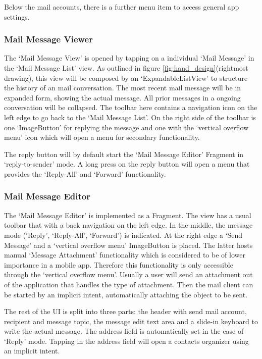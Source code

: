 \documentclass[a4paper,11pt,twoside]{article}
\begin{document}
Below the mail accounts, there is a further menu item to access general app
settings.

\subsubsection{Mail Message Viewer}
The `Mail Message View' is opened by tapping on a individual `Mail Message' in
the `Mail Message List' view. As outlined in figure
\ref{fig:hand_design}(rightmost drawing), this view will be composed by an
`ExpandableListView' to structure the history of an mail conversation. The most
recent mail message will be in expanded form, showing the actual message. All
prior messages in a ongoing conversation will be collapsed. The toolbar here
contains a navigation icon on the left edge to go back to the `Mail Message
List'. On the right side of the toolbar is one `ImageButton' for replying the
message and one with the `vertical overflow menu' icon which will open a menu
for secondary functionality.

The reply button will by default start the `Mail Message Editor' Fragment in
`reply-to-sender' mode. A long press on the reply button will open a menu that
provides the `Reply-All' and `Forward' functionality.


\subsubsection{Mail Message Editor}
The `Mail Message Editor' is implemented as a Fragment. The view has a usual
toolbar that with a back navigation on the left edge. In the middle, the message
mode (`Reply', `Reply-All', `Forward') is indicated. At the right edge a `Send
Message' and a `vertical overflow menu' ImageButton is placed. The latter hosts
manual `Message Attachment' functionality which is considered to be of lower importance
in a mobile app. Therefore this functionality is only accessible through the
`vertical overflow menu'. Usually a user will send an attachment out of the
application that handles the type of attachment. Then the mail client can be
started by an implicit intent, automatically attaching the object to be sent.

The rest of the UI is split  into three parts: the  header with send mail
account, recipient and message topic, the message edit text area and a slide-in
keyboard to write the actual message. The address field is automatically set
in the case of `Reply' mode. Tapping in the address field will open a contacts
organizer using an implicit intent.
\end{document}
